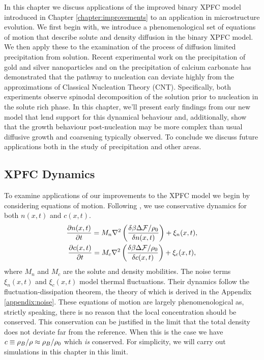 \label{chapter:applications}

In this chapter we discuss applications of the improved binary XPFC model
introduced in Chapter \ref{chapter:improvements} to an application in
microstructure evolution.  We first begin with, we introduce  a
phenomenological set of equations of motion that describe solute and density
diffusion in the binary XPFC model. We then apply these to the examination of
the process of diffusion limited precipitation from solution.  Recent
experimental work on the precipitation of gold and silver nanoparticles
\cite{LOH17} and on the precipitation of calcium carbonate \cite{WALLACE13} has
demonstrated that the pathway to nucleation can deviate highly from the
approximations of Classical Nucleation Theory (CNT).  Specifically, both
experiments observe spinodal decomposition of the solution prior to nucleation
in the solute rich phase. In this chapter, we'll present early findings from
our new model that lend support for this dynamical behaviour and, additionally,
show that the growth behaviour post-nucleation may be more complex than usual
diffusive growth and coarsening typically observed.  To conclude we discuss
future applications both in the study of precipitation and other areas.

\subsection{XPFC Dynamics} %

To examine applications of our improvements to the XPFC model we begin by
considering equations of motion. Following \cite{GREENWOOD11_BINARY}, we use
conservative dynamics for both $n(x, t)$ and $c(x, t)$.
%
\begin{gather}
    \frac{\partial n(x, t)}{\partial t} = 
        M_n \nabla^2\left(\frac{\delta \beta \Delta\mathcal{F} / \rho_0}{\delta n(x, t)}\right) 
        + \xi_n(x, t), \\ 
    \frac{\partial c(x, t)}{\partial t} = 
        M_c \nabla^2\left(\frac{\delta \beta \Delta \mathcal{F} / \rho_0}{\delta c(x, t)}\right)
        + \xi_c(x, t),
\end{gather}
%
where $M_n$ and $M_c$ are the solute and density mobilities. The noise terms
$\xi_n(x, t)$ and $\xi_c(x, t)$ model thermal fluctuations. Their dynamics
follow the fluctuation-dissipation theorem, the theory of which is derived in
the Appendix \ref{appendix:noise}. These equations of motion are largely
phenomenological as, strictly speaking, there is no reason that the local
concentration should be conserved.  This conservation can be justified in the
limit that the total density does not deviate far from the reference. When this
is the case we have $c \equiv \rho_B / \rho \approx \rho_B / \rho_0$ which \textit{is}
conserved. For simplicity, we will carry out simulations in this chapter in
this limit.

